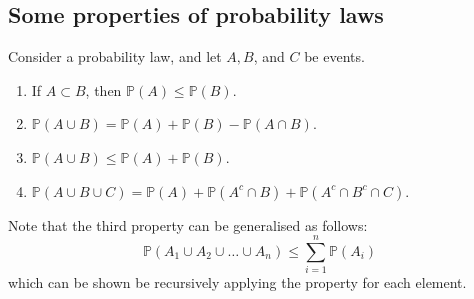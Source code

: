 \documentclass{report}
\begin{document}
\subsection{Some properties of probability laws}
Consider a probability law, and let $A,B$, and $C$ be events.
\begin{enumerate}
\item If $A\subset B$, then $\mathbb P(A)\leq\mathbb P(B)$.
\item $\mathbb P(A\cup B)=\mathbb P(A)+\mathbb P(B)-\mathbb P(A\cap B)$.
\item $\mathbb P(A\cup B)\leq \mathbb P(A)+\mathbb P(B)$.
\item $\mathbb P(A\cup B\cup C)=\mathbb P(A)+\mathbb P(A^c\cap B)+\mathbb P(A^c\cap B^c\cap C)$.
\end{enumerate}
Note that the third property can be generalised as follows:
\begin{equation*}
\mathbb P(A_1\cup A_2\cup\ldots\cup A_n)\leq\sum^n_{i=1}\mathbb P(A_i)
\end{equation*}
which can be shown be recursively applying the property for each element.
\newpage
\end{document}
